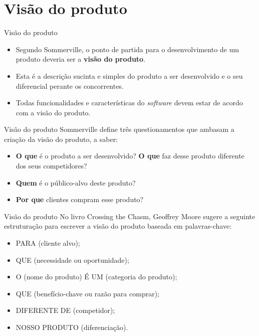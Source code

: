 \documentclass[11pt]{beamer}
\begin{document}
   \section{Visão do produto}

   \begin{frame}{Visão do produto}
      \begin{itemize}
         \item Segundo Sommerville, o ponto de partida para o desenvolvimento de um produto deveria ser a \textbf{visão do produto}.
         \item Esta é a descrição sucinta e simples do produto a ser desenvolvido e o seu diferencial perante os concorrentes.
         \item Todas funcionalidades e características do \textit{software} devem estar de acordo com a visão do produto.
      \end{itemize}
   \end{frame}

   \begin{frame}{Visão do produto}
      Sommerville define três questionamentos que ambasam a criação da visão do produto, a saber:
      \begin{itemize}
         \item \textbf{O que} é o produto a ser desenvolvido? \textbf{O que} faz desse produto diferente dos seus competidores?
         \item \textbf{Quem} é o público-alvo deste produto?
         \item \textbf{Por que} clientes compram esse produto?
      \end{itemize}
   \end{frame}

   \begin{frame}{Visão do produto}
      No livro Crossing the Chasm, Geoffrey Moore sugere a seguinte estruturação para escrever a visão do produto baseada em palavras-chave:
      \begin{itemize}
         \item PARA (cliente alvo);
         \item QUE (necessidade ou oportunidade);
         \item O (nome do produto) É UM (categoria do produto);
         \item QUE (benefício-chave ou razão para comprar);
         \item DIFERENTE DE (competidor);
         \item NOSSO PRODUTO (diferenciação).
      \end{itemize}
   \end{frame}
\end{document}
